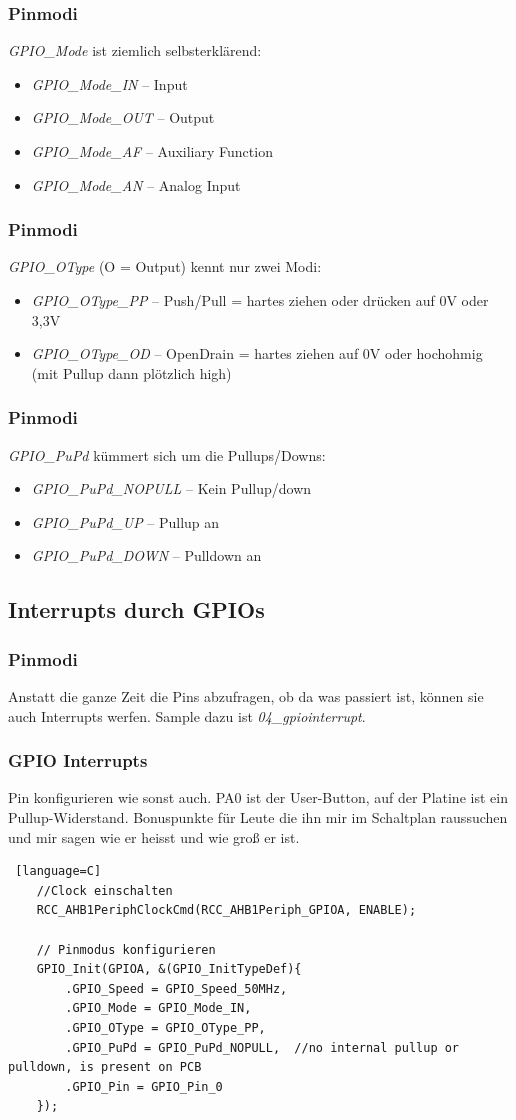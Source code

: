 \documentclass[ngerman,compress]{beamer}
\begin{document}
\begin{frame}
	\frametitle{Pinmodi}
	\emph{GPIO\_Mode} ist ziemlich selbsterklärend:
	\begin{itemize}
		\item \emph{GPIO\_Mode\_IN} -- Input
		\item \emph{GPIO\_Mode\_OUT} -- Output
		\item \emph{GPIO\_Mode\_AF} -- Auxiliary Function
		\item \emph{GPIO\_Mode\_AN} -- Analog Input
	\end{itemize}
\end{frame}

\begin{frame}
	\frametitle{Pinmodi}
	\emph{GPIO\_OType} (O = Output) kennt nur zwei Modi:
	\begin{itemize}
		\item \emph{GPIO\_OType\_PP} -- Push/Pull = hartes ziehen oder drücken auf 0V oder 3,3V
		\item \emph{GPIO\_OType\_OD} -- OpenDrain = hartes ziehen auf 0V oder hochohmig (mit Pullup dann plötzlich high)
	\end{itemize}
\end{frame}

\begin{frame}
	\frametitle{Pinmodi}
	\emph{GPIO\_PuPd} kümmert sich um die Pullups/Downs:
	\begin{itemize}
		\item \emph{GPIO\_PuPd\_NOPULL} -- Kein Pullup/down
		\item \emph{GPIO\_PuPd\_UP} -- Pullup an
		\item \emph{GPIO\_PuPd\_DOWN} -- Pulldown an
	\end{itemize}
\end{frame}


\subsection{Interrupts durch GPIOs}

\begin{frame}
	\frametitle{Pinmodi}
	Anstatt die ganze Zeit die Pins abzufragen, ob da was passiert ist, können sie auch Interrupts werfen. Sample dazu ist \emph{04\_gpiointerrupt}.
\end{frame}

\begin{frame} [fragile]
	\frametitle{GPIO Interrupts}
	Pin konfigurieren wie sonst auch. PA0 ist der User-Button, auf der Platine ist ein Pullup-Widerstand. Bonuspunkte für Leute die ihn mir im Schaltplan raussuchen und mir sagen wie er heisst und wie groß er ist.
	\begin{lstlisting} [language=C]
	//Clock einschalten
	RCC_AHB1PeriphClockCmd(RCC_AHB1Periph_GPIOA, ENABLE);

	// Pinmodus konfigurieren
	GPIO_Init(GPIOA, &(GPIO_InitTypeDef){
		.GPIO_Speed = GPIO_Speed_50MHz,
		.GPIO_Mode = GPIO_Mode_IN,
		.GPIO_OType = GPIO_OType_PP,
		.GPIO_PuPd = GPIO_PuPd_NOPULL,	//no internal pullup or pulldown, is present on PCB
		.GPIO_Pin = GPIO_Pin_0
	});
	\end{lstlisting}
\end{frame}
\end{document}
